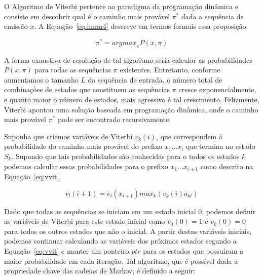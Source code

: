 O Algoritmo de Viterbi pertence ao paradigma da programação dinâmica e consiste em descobrir qual é o caminho mais provável $ \pi^\ast $ dada a sequência de emissão $ x $. A Equação~\ref{eq:hmm4} descreve em termos formais essa proposição.

\begin{equation}\label{eq:hmm4}
    \pi^\ast = {argmax}_\pi P(x,\pi)
\end{equation}

A forma exaustiva de resolução de tal algoritmo seria calcular as probabilidades $ P(x,\pi) $ para todas as sequências $ \pi $ existentes. Entretanto, conforme aumentamos o tamanho $ L $ da sequência de entrada, o número total de combinações de estados que constituem as sequências $ \pi $ cresce exponencialmente, e quanto maior o número de estados, mais agressivo é tal crescimento. Felizmente, Viterbi apontou uma solução baseada em programação dinâmica, onde o caminho mais provável $ \pi^\ast $ pode ser encontrado recursivamente.

Suponha que criemos variáveis de Viterbi $ v_k(i) $, que correspondem à probabilidade do caminho mais provável do prefixo $ x_1 ... x_i $ que termina no estado $ S_k $. Supondo que tais probabilidades são conhecidas para o todos os estados $ k $ podemos calcular essas probabilidades para o prefixo $ x_1 ... x_{i+1} $ como descrito na Equação~\ref{eq:vvit}.

\begin{equation}\label{eq:vvit}
    v_l(i+1) = e_l(x_{i+1}) {max}_k(v_k(i) a_{kl})
\end{equation}

Dado que todas as sequências se iniciam em um estado inicial $ 0 $, podemos definir as variáveis de Viterbi para este estado inicial como $ v_0(0) = 1 $ e $  v_k(0) = 0 $ para todos os outros estados que não o inicial. A partir destas variáveis iniciais, podemos continuar calculando as variáveis dos próximos estados segundo a Equação~\ref{eq:vvit} e manter um ponteiro $ ptr $ para os estados que possuíram a maior probabilidade em cada iteração. Tal algoritmo, que é possível dada a propriedade chave das cadeias de Markov, é definido a seguir:

